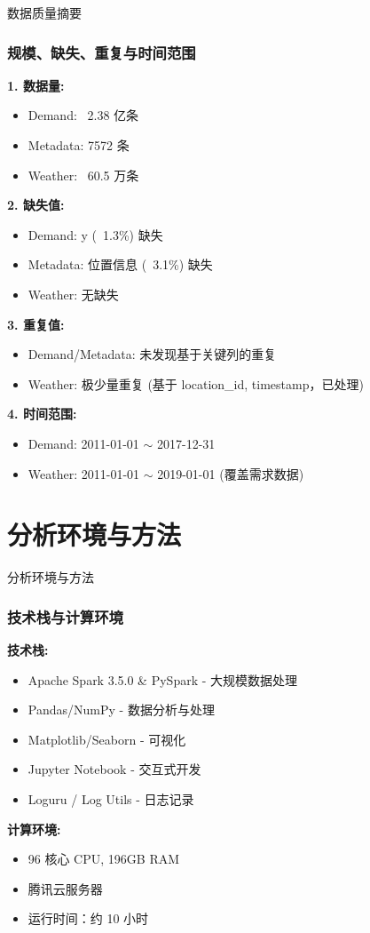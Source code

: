 \documentclass{beamer} %
\begin{document}
\begin{frame}{数据质量摘要}
    \frametitle{规模、缺失、重复与时间范围}
    \textbf{1. 数据量:}
    \begin{itemize}
        \item Demand: ~2.38 亿条
        \item Metadata: 7572 条
        \item Weather: ~60.5 万条
    \end{itemize}

    \textbf{2. 缺失值:}
    \begin{itemize}
        \item Demand: y (~1.3\%) 缺失
        \item Metadata: 位置信息 (~3.1\%) 缺失
        \item Weather: 无缺失
    \end{itemize}

    \textbf{3. 重复值:}
    \begin{itemize}
        \item Demand/Metadata: 未发现基于关键列的重复
        \item Weather: 极少量重复 (基于 location\_id, timestamp，已处理)
    \end{itemize}

    \textbf{4. 时间范围:}
    \begin{itemize}
        \item Demand: 2011-01-01 \(\sim\) 2017-12-31
        \item Weather: 2011-01-01 \(\sim\) 2019-01-01 (覆盖需求数据)
    \end{itemize}
\end{frame}

\section{分析环境与方法}
\begin{frame}{分析环境与方法}
    \frametitle{技术栈与计算环境}
    \textbf{技术栈:}
    \begin{itemize}
        \item Apache Spark 3.5.0 \& PySpark - 大规模数据处理
        \item Pandas/NumPy - 数据分析与处理
        \item Matplotlib/Seaborn - 可视化
        \item Jupyter Notebook - 交互式开发
        \item Loguru / Log Utils - 日志记录
    \end{itemize}

    \textbf{计算环境:}
    \begin{itemize}
        \item 96 核心 CPU, 196GB RAM
        \item 腾讯云服务器
        \item 运行时间：约 10 小时
    \end{itemize}
\end{frame}
\end{document}
